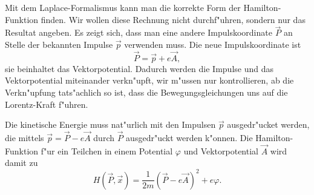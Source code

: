 Mit dem Laplace-Formalismus kann man die korrekte Form der
Hamilton-Funktion finden.
Wir wollen diese Rechnung nicht durchf"uhren, sondern nur das Resultat
angeben.
Es zeigt sich, dass man eine andere Impulskoordinate $\vec P$
an Stelle der bekannten Impulse $\vec p$ verwenden muss. 
Die neue Impulskoordinate ist 
\[
\vec P = \vec p + e\vec A,
\]
sie beinhaltet das Vektorpotential.
Dadurch werden die Impulse und das Vektorpotential miteinander 
verkn"upft, wir m"ussen nur kontrollieren, ab die Verkn"upfung
tats"achlich so ist, dass die Bewegungsgleichungen uns auf die
Lorentz-Kraft f"uhren.

Die kinetische Energie muss nat"urlich mit den Impulsen $\vec p$ ausgedr"ucket
werden, die mittels $\vec p=\vec P-e\vec A$ durch $\vec P$
ausgedr"uckt werden k"onnen.
Die Hamilton-Funktion f"ur ein Teilchen in einem Potential $\varphi$
und Vektorpotential $\vec A$ wird damit zu
\begin{equation}
H(\vec P, \vec x)=\frac1{2m}(\vec P-e\vec A)^2+e\varphi.
\label{skript:hamiltonmitmagnetfeld}
\end{equation}

